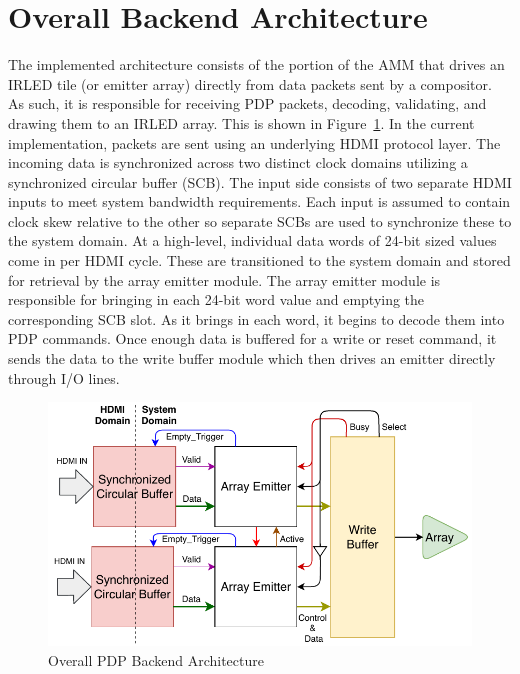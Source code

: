 \section{Overall Backend Architecture}
    \label{sec:backend_arch}
    The implemented architecture consists of the portion of the AMM that drives an IRLED tile (or emitter array) directly from data packets sent by a compositor. As such, it is responsible for receiving PDP packets, decoding, validating, and drawing them to an IRLED array. This is shown in Figure~\ref{fig:overall_arch}. In the current implementation, packets are sent using an underlying HDMI protocol layer. The incoming data is synchronized across two distinct clock domains utilizing a synchronized circular buffer (SCB). The input side consists of two separate HDMI inputs to meet system bandwidth requirements. Each input is assumed to contain clock skew relative to the other so separate SCBs are used to synchronize these to the system domain. At a high-level, individual data words of 24-bit sized values come in per HDMI cycle. These are transitioned to the system domain and stored for retrieval by the array emitter module. The array emitter module is responsible for bringing in each 24-bit word value and emptying the corresponding SCB slot. As it brings in each word, it begins to decode them into PDP commands. Once enough data is buffered for a write or reset command, it sends the data to the write buffer module which then drives an emitter directly through I/O lines.

    \begin{figure}
        \centering
        \includegraphics[width=1.0\textwidth]{fig/pdp_overall_arch.pdf}
        \caption{Overall PDP Backend Architecture}
        \label{fig:overall_arch}
    \end{figure}

